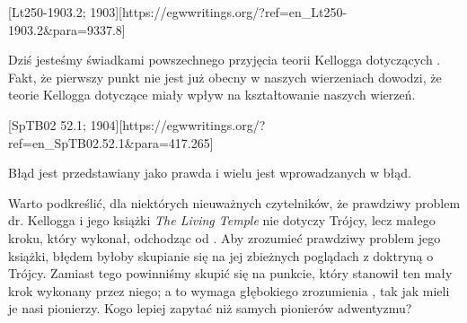 [Lt250-1903.2; 1903][https://egwwritings.org/?ref=en\_Lt250-1903.2&para=9337.8]

Dziś jesteśmy świadkami powszechnego przyjęcia teorii Kellogga dotyczących . Fakt, że pierwszy punkt  nie jest już obecny w naszych wierzeniach dowodzi, że teorie Kellogga dotyczące  miały wpływ na kształtowanie naszych wierzeń.

[SpTB02 52.1; 1904][https://egwwritings.org/?ref=en\_SpTB02.52.1&para=417.265]

Błąd jest przedstawiany jako prawda i wielu jest wprowadzanych w błąd.

Warto podkreślić, dla niektórych nieuważnych czytelników, że prawdziwy problem dr. Kellogga i jego książki \textit{The Living Temple} nie dotyczy Trójcy, lecz małego kroku, który wykonał, odchodząc od . Aby zrozumieć prawdziwy problem jego książki, błędem byłoby skupianie się na jej zbieżnych poglądach z doktryną o Trójcy. Zamiast tego powinniśmy skupić się na punkcie, który stanowił ten mały krok wykonany przez niego; a to wymaga głębokiego zrozumienia , tak jak mieli je nasi pionierzy. Kogo lepiej zapytać niż samych pionierów adwentyzmu?



